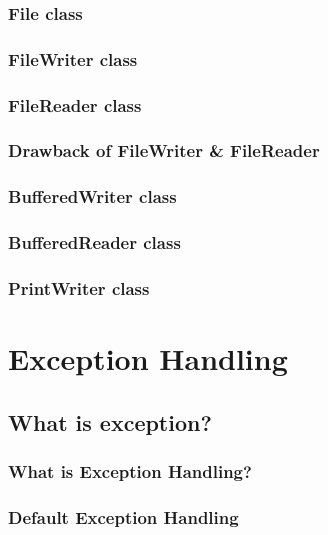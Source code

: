 \documentclass[14pt,fleqn]{extbook} %
\begin{document}
\subsection{File class}

\subsection{FileWriter class}

\subsection{FileReader class}

\subsection{Drawback of FileWriter \& FileReader}

\subsection{BufferedWriter class}

\subsection{BufferedReader class}

\subsection{PrintWriter class}



\chapter{Exception Handling}
\section{What is exception?}

\subsection{What is Exception Handling?}

\subsection{Default Exception Handling}

\end{document}
